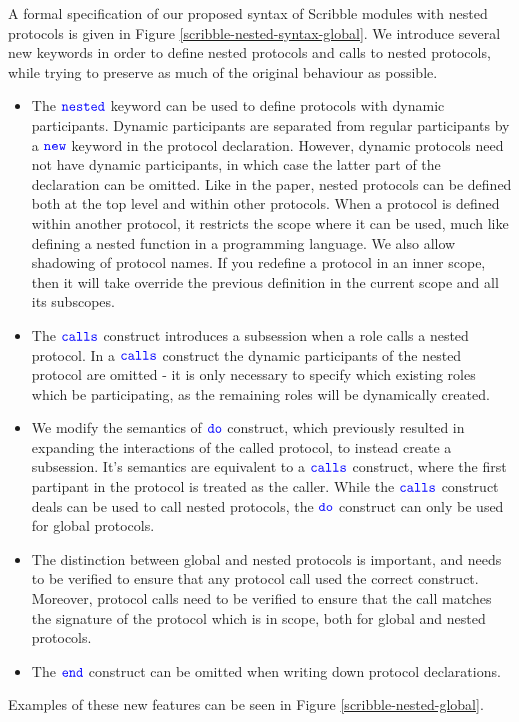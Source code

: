 \documentclass[12pt,twoside]{report}
\begin{document}
A formal specification of our proposed syntax of Scribble modules with nested protocols is given in Figure \ref{scribble-nested-syntax-global}. We introduce several new keywords in order to define nested protocols and calls to nested protocols, while trying to preserve as much of the original behaviour as possible.
\begin{itemize}
    \item The ${\color{blue}\mathtt{nested}}$ keyword can be used to define protocols with dynamic participants. Dynamic participants are separated from regular participants by a ${\color{blue}\mathtt{new}}$ keyword in the protocol declaration. However, dynamic protocols need not have dynamic participants, in which case the latter part of the declaration can be omitted. Like in the paper, nested protocols can be defined both at the top level and within other protocols. When a protocol is defined within another protocol, it restricts the scope where it can be used, much like defining a nested function in a programming language. We also allow shadowing of protocol names. If you redefine a protocol in an inner scope, then it will take override the previous definition in the current scope and all its subscopes.
    \item The ${\color{blue}\mathtt{calls}}$ construct introduces a subsession when a role calls a nested protocol. In a ${\color{blue}\mathtt{calls}}$ construct the dynamic participants of the nested protocol are omitted - it is only necessary to specify which existing roles which be participating, as the remaining roles will be dynamically created.
    \item We modify the semantics of ${\color{blue}\mathtt{do}}$ construct, which previously resulted in expanding the interactions of the called protocol, to instead create a subsession. It's semantics are equivalent to a ${\color{blue}\mathtt{calls}}$ construct, where the first partipant in the protocol is treated as the caller. While the ${\color{blue}\mathtt{calls}}$ construct deals can be used to call nested protocols, the ${\color{blue}\mathtt{do}}$ construct can only be used for global protocols. 
    \item The distinction between global and nested protocols is important, and needs to be verified to ensure that any protocol call used the correct construct. Moreover, protocol calls need to be verified to ensure that the call matches the signature of the protocol which is in scope, both for global and nested protocols.
    \item The ${\color{blue}\mathtt{end}}$ construct can be omitted when writing down protocol declarations.
\end{itemize}

Examples of these new features can be seen in Figure \ref{scribble-nested-global}.
\end{document}
